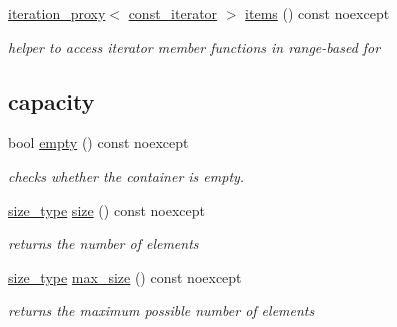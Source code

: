 \begin{DoxyCompactItemize}
\mbox{\hyperlink{classnlohmann_1_1detail_1_1iteration__proxy}{iteration\+\_\+proxy}}$<$ \mbox{\hyperlink{classnlohmann_1_1basic__json_a41a70cf9993951836d129bb1c2b3126a}{const\+\_\+iterator}} $>$ \mbox{\hyperlink{classnlohmann_1_1basic__json_a71dd7adfca43660c10e6624f4b5c290c}{items}} () const noexcept
\begin{DoxyCompactList}\small\item\em helper to access iterator member functions in range-\/based for \end{DoxyCompactList}\end{DoxyCompactItemize}
\subsection*{capacity}
\begin{DoxyCompactItemize}
\item 
bool \mbox{\hyperlink{classnlohmann_1_1basic__json_a1a86d444bfeaa9518d2421aedd74444a}{empty}} () const noexcept
\begin{DoxyCompactList}\small\item\em checks whether the container is empty. \end{DoxyCompactList}\item 
\mbox{\hyperlink{classnlohmann_1_1basic__json_a39f2cd0b58106097e0e67bf185cc519b}{size\+\_\+type}} \mbox{\hyperlink{classnlohmann_1_1basic__json_a25e27ad0c6d53c01871c5485e1f75b96}{size}} () const noexcept
\begin{DoxyCompactList}\small\item\em returns the number of elements \end{DoxyCompactList}\item 
\mbox{\hyperlink{classnlohmann_1_1basic__json_a39f2cd0b58106097e0e67bf185cc519b}{size\+\_\+type}} \mbox{\hyperlink{classnlohmann_1_1basic__json_a2f47d3c6a441c57dd2be00449fbb88e1}{max\+\_\+size}} () const noexcept
\begin{DoxyCompactList}\small\item\em returns the maximum possible number of elements \end{DoxyCompactList}\end{DoxyCompactItemize}
